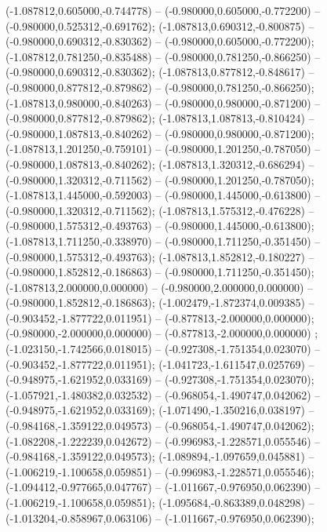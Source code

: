  (-1.087812,0.605000,-0.744778) -- (-0.980000,0.605000,-0.772200) -- (-0.980000,0.525312,-0.691762);
 (-1.087813,0.690312,-0.800875) -- (-0.980000,0.690312,-0.830362) -- (-0.980000,0.605000,-0.772200);
 (-1.087812,0.781250,-0.835488) -- (-0.980000,0.781250,-0.866250) -- (-0.980000,0.690312,-0.830362);
 (-1.087813,0.877812,-0.848617) -- (-0.980000,0.877812,-0.879862) -- (-0.980000,0.781250,-0.866250);
 (-1.087813,0.980000,-0.840263) -- (-0.980000,0.980000,-0.871200) -- (-0.980000,0.877812,-0.879862);
 (-1.087813,1.087813,-0.810424) -- (-0.980000,1.087813,-0.840262) -- (-0.980000,0.980000,-0.871200);
 (-1.087813,1.201250,-0.759101) -- (-0.980000,1.201250,-0.787050) -- (-0.980000,1.087813,-0.840262);
 (-1.087813,1.320312,-0.686294) -- (-0.980000,1.320312,-0.711562) -- (-0.980000,1.201250,-0.787050);
 (-1.087813,1.445000,-0.592003) -- (-0.980000,1.445000,-0.613800) -- (-0.980000,1.320312,-0.711562);
 (-1.087813,1.575312,-0.476228) -- (-0.980000,1.575312,-0.493763) -- (-0.980000,1.445000,-0.613800);
 (-1.087813,1.711250,-0.338970) -- (-0.980000,1.711250,-0.351450) -- (-0.980000,1.575312,-0.493763);
 (-1.087813,1.852812,-0.180227) -- (-0.980000,1.852812,-0.186863) -- (-0.980000,1.711250,-0.351450);
 (-1.087813,2.000000,0.000000) -- (-0.980000,2.000000,0.000000) -- (-0.980000,1.852812,-0.186863);
 (-1.002479,-1.872374,0.009385) -- (-0.903452,-1.877722,0.011951) -- (-0.877813,-2.000000,0.000000);
 (-0.980000,-2.000000,0.000000) -- (-0.877813,-2.000000,0.000000) ;
 (-1.023150,-1.742566,0.018015) -- (-0.927308,-1.751354,0.023070) -- (-0.903452,-1.877722,0.011951);
 (-1.041723,-1.611547,0.025769) -- (-0.948975,-1.621952,0.033169) -- (-0.927308,-1.751354,0.023070);
 (-1.057921,-1.480382,0.032532) -- (-0.968054,-1.490747,0.042062) -- (-0.948975,-1.621952,0.033169);
 (-1.071490,-1.350216,0.038197) -- (-0.984168,-1.359122,0.049573) -- (-0.968054,-1.490747,0.042062);
 (-1.082208,-1.222239,0.042672) -- (-0.996983,-1.228571,0.055546) -- (-0.984168,-1.359122,0.049573);
 (-1.089894,-1.097659,0.045881) -- (-1.006219,-1.100658,0.059851) -- (-0.996983,-1.228571,0.055546);
 (-1.094412,-0.977665,0.047767) -- (-1.011667,-0.976950,0.062390) -- (-1.006219,-1.100658,0.059851);
 (-1.095684,-0.863389,0.048298) -- (-1.013204,-0.858967,0.063106) -- (-1.011667,-0.976950,0.062390);

